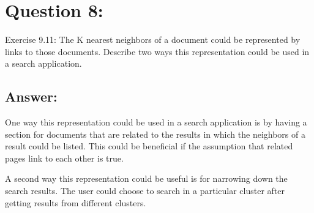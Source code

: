 \section*{Question 8:}
Exercise 9.11:
The K nearest neighbors of a document could be represented by links to those documents. Describe two ways this representation could be used in a search application.

\subsection*{Answer:}

One way this representation could be used in a search application is by having a section for documents that are related to the results in which the neighbors of a result could be listed. This could be beneficial if the assumption that related pages link to each other is true.

A second way this representation could be useful is for narrowing down the search results. The user could choose to search in a particular cluster after getting results from different clusters.